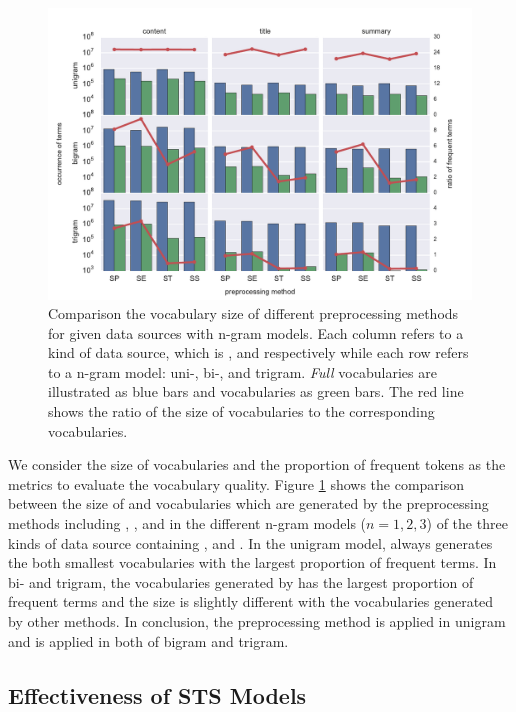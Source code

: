 \begin{figure}[!htb]
    \centering
    \includegraphics[width=\textwidth]{fig/vocab_size}
    \caption{Comparison the vocabulary size of different preprocessing methods for given data sources with n-gram models. Each column refers to a kind of data source, which is \icontent{}, \ititle{} and \isummary{} respectively while each row refers to a n-gram model: uni-, bi-, and trigram. \textit{Full} vocabularies are illustrated as blue bars and \icommon{} vocabularies as green bars. The red line shows the ratio of the size of \icommon{} vocabularies to the corresponding \ifull{} vocabularies. }
    \label{fig:vocab_size}
\end{figure}


We consider the size of \ifull{} vocabularies and the proportion of frequent tokens as the metrics to evaluate the vocabulary quality. Figure \ref{fig:vocab_size} shows the comparison between the size of \ifull{} and \icommon{} vocabularies which are generated by the preprocessing methods including \iSP{}, \iSE{}, \iST{} and \iSS{} in the different n-gram models ($n=1, 2, 3$) of the three kinds of data source containing \icontent{}, \ititle{} and \isummary{}. In the unigram model, \iSS{} always generates the both smallest vocabularies with the largest proportion of frequent terms. In bi- and trigram, the vocabularies generated by \iSE{} has the largest proportion of frequent terms and the size is slightly different with the vocabularies generated by other methods. In conclusion, the preprocessing method \iSS{} is applied in unigram and \iSE{} is applied in both of bigram and trigram. 


\subsection{Effectiveness of STS Models}
\label{sec:5.2}

